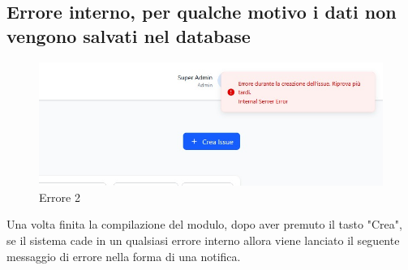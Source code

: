 \subsection{Errore interno, per qualche motivo i dati non vengono salvati nel database}
\begin{figure}
	\centering
	\includegraphics[width=1\linewidth]{./Assets/Chapters/mkp7.jpg}
	\caption{Errore 2}
\end{figure}
Una volta finita la compilazione del modulo, dopo aver premuto il tasto "Crea", se il sistema cade in un qualsiasi errore interno allora viene lanciato il seguente messaggio di errore nella forma di una notifica.
